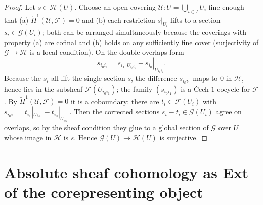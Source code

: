 \begin{proof}
  Let \(s \in \mathcal{H}(U)\). Choose an open covering \(\mathcal{U} : U =
  \bigcup_{i \in I} U_i\) fine enough that (a) \(\check{H}^1(\mathcal{U},
  \mathcal{F}) = 0\) and (b) each restriction \(s|_{U_i}\) lifts to a section
  \(s_i \in \mathcal{G}(U_i)\); both can be arranged simultaneously because the
  coverings with property (a) are cofinal and (b) holds on any sufficiently fine
  cover (surjectivity of \(\mathcal{G} \to \mathcal{H}\) is a local condition).
  On the double overlaps form
  \[
    s_{i_0 i_1} = s_{i_1}|_{U_{i_0 i_1}} - s_{i_0}|_{U_{i_0 i_1}}.
  \]
  Because the \(s_i\) all lift the single section \(s\), the difference
  \(s_{i_0 i_1}\) maps to \(0\) in \(\mathcal{H}\), hence lies in the subsheaf
  \(\mathcal{F}(U_{i_0 i_1})\); the family \((s_{i_0 i_1})\) is a {\v C}ech
  \(1\)-cocycle for \(\mathcal{F}\). By \(\check{H}^1(\mathcal{U}, \mathcal{F}) = 0\)
  it is a coboundary: there are \(t_i \in \mathcal{F}(U_i)\) with
  \(s_{i_0 i_1} = t_{i_1}|_{U_{i_0 i_1}} - t_{i_0}|_{U_{i_0 i_1}}\). Then the
  corrected sections \(s_i - t_i \in \mathcal{G}(U_i)\) agree on overlaps, so by the
  sheaf condition they glue to a global section of \(\mathcal{G}\) over \(U\) whose
  image in \(\mathcal{H}\) is \(s\). Hence \(\mathcal{G}(U) \to \mathcal{H}(U)\) is
  surjective.
\end{proof}

\section{Absolute sheaf cohomology as Ext of the corepresenting object}

